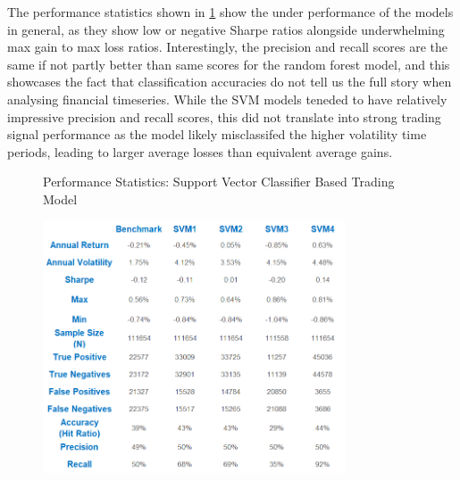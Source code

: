 \documentclass[11pt]{article}
\begin{document}
The performance statistics shown in \ref{fig:SVMRandomDataStats} show the under performance of the models in general, as they show low or negative Sharpe ratios alongside underwhelming max gain to max loss ratios. Interestingly, the precision and recall scores are the same if not partly better than same scores for the random forest model, and this showcases the fact that classification accuracies do not tell us the full story when analysing financial timeseries. While the SVM models teneded to have relatively impressive precision and recall scores, this did not translate into strong trading signal performance as the model likely misclassifed the higher volatility time periods, leading to larger average losses than equivalent average gains. 

\begin{figure}[h]
    \centering
	\caption{Performance Statistics: Support Vector Classifier Based Trading Model}    
	\includegraphics[width=0.8\textwidth]{SVMRandomDataStatsv2}
    \label{fig:SVMRandomDataStats}
     \caption*{}
\end{figure}

\clearpage
\end{document}
